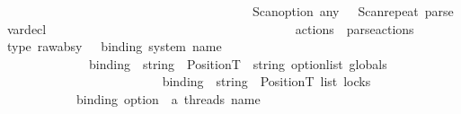 \begin{isabellebody}
\ \ \ \ \ \ \ \ \ \ \ \ \ \ \ \ \ \ \ \ \ \ \ \ \ \ \ \ \ \ \ \ \ \ \ \ \ \ {\isacharminus}{\kern0pt}{\isacharminus}{\kern0pt}\ {\isacharparenleft}{\kern0pt}Scan{\isachardot}{\kern0pt}option\ {\isacharparenleft}{\kern0pt}\isactrlkeyword {\isasymopen}any{\isasymclose}\ {\isacharbar}{\kern0pt}{\isacharminus}{\kern0pt}{\isacharminus}{\kern0pt}\ \ Scan{\isachardot}{\kern0pt}repeat{}\ {\isacharparenleft}{\kern0pt}parse{\isacharunderscore}{\kern0pt}var{\isacharunderscore}{\kern0pt}decl{\isacharparenright}{\kern0pt}\ {\isacharparenright}{\kern0pt}{\isacharparenright}{\kern0pt}\isanewline
\ \ \ \ \ \ \ \ \ \ \ \ \ \ \ \ \ \ \ \ \ \ \ \ \ \ \ \ \ \ \ \ \ \ \ \ \ {\isacharminus}{\kern0pt}{\isacharminus}{\kern0pt}\ {\isacharparenleft}{\kern0pt}\isactrlkeyword {\isasymopen}actions{\isasymclose}\ {\isacharbar}{\kern0pt}{\isacharminus}{\kern0pt}{\isacharminus}{\kern0pt}\ parse{\isacharunderscore}{\kern0pt}actions{\isacharparenright}{\kern0pt}{\isacharparenright}{\kern0pt}\isanewline
\isanewline
type\ raw{\isacharunderscore}{\kern0pt}absy\ {\isacharequal}{\kern0pt}\ \ {\isacharparenleft}{\kern0pt}{\isacharparenleft}{\kern0pt}{\isacharparenleft}{\kern0pt}binding\ {\isacharparenleft}{\kern0pt}{\isacharasterisk}{\kern0pt}system\ name{\isacharasterisk}{\kern0pt}{\isacharparenright}{\kern0pt}\isanewline
\ \ \ \ \ \ \ \ \ \ \ \ {\isacharasterisk}{\kern0pt}\isanewline
\ \ \ \ \ \ \ \ \ \ \ \ \ {\isacharparenleft}{\kern0pt}{\isacharparenleft}{\kern0pt}binding\ {\isacharasterisk}{\kern0pt}\ {\isacharparenleft}{\kern0pt}string\ {\isacharasterisk}{\kern0pt}\ Position{\isachardot}{\kern0pt}T{\isacharparenright}{\kern0pt}{\isacharparenright}{\kern0pt}\ {\isacharasterisk}{\kern0pt}\ string\ option{\isacharparenright}{\kern0pt}list{\isacharparenright}{\kern0pt}\ {\isacharparenleft}{\kern0pt}{\isacharasterisk}{\kern0pt}globals{\isacharasterisk}{\kern0pt}{\isacharparenright}{\kern0pt}\isanewline
\ \ \ \ \ \ \ \ \ \ \ \ {\isacharasterisk}{\kern0pt}\isanewline
\ \ \ \ \ \ \ \ \ \ \ \ {\isacharparenleft}{\kern0pt}binding\ {\isacharasterisk}{\kern0pt}\ {\isacharparenleft}{\kern0pt}string\ {\isacharasterisk}{\kern0pt}\ Position{\isachardot}{\kern0pt}T{\isacharparenright}{\kern0pt}{\isacharparenright}{\kern0pt}\ list{\isacharparenright}{\kern0pt}\ {\isacharparenleft}{\kern0pt}{\isacharasterisk}{\kern0pt}locks{\isacharasterisk}{\kern0pt}{\isacharparenright}{\kern0pt}\isanewline
\ \ \ \ \ \ \ \ \ \ \ {\isacharasterisk}{\kern0pt}\isanewline
\ \ \ \ \ \ \ \ \ \ \ {\isacharparenleft}{\kern0pt}{\isacharparenleft}{\kern0pt}binding\ option\ {\isacharasterisk}{\kern0pt}\ {\isacharparenleft}{\kern0pt}{\isacharasterisk}{\kern0pt}a\ thread{\isacharprime}{\kern0pt}s\ name{\isacharasterisk}{\kern0pt}{\isacharparenright}{\kern0pt}\isanewline

\end{isabellebody}
